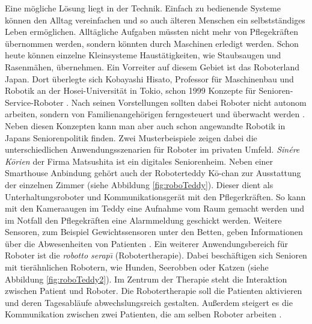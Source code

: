 Eine mögliche Lösung liegt in der Technik. Einfach zu bedienende Systeme können den Alltag vereinfachen und so auch älteren Menschen ein selbstständiges Leben ermöglichen. Alltägliche Aufgaben müssten nicht mehr von Pflegekräften übernommen werden, sondern könnten durch Maschinen erledigt werden. Schon heute können einzelne Kleinsysteme Haustätigkeiten, wie Staubsaugen und Rasenmähen, übernehmen. Ein Vorreiter auf diesem Gebiet ist das Roboterland Japan. Dort überlegte sich Kobayashi Hisato, Professor für Maschinenbau und Robotik an der Hosei-Universität in Tokio, schon 1999 Konzepte für Senioren-Service-Roboter \citep{wagner2009tele}. Nach seinen Vorstellungen sollten dabei Roboter nicht autonom arbeiten, sondern von Familienangehörigen ferngesteuert und überwacht werden \citep{kobayashihisato1999}. Neben diesen Konzepten kann man aber auch schon angewandte Robotik in Japans Seniorenpolitik finden. Zwei Musterbeispiele zeigen dabei die unterschiedlichen Anwendungsszenarien für Roboter im privaten Umfeld. \textit{Sinére K\={o}rien} der Firma Matsushita ist ein digitales Seniorenheim. Neben einer Smarthouse Anbindung gehört auch der Roboterteddy K\={o}-chan zur Ausstattung der einzelnen Zimmer (siehe Abbildung \ref{fig:roboTeddy}). Dieser dient als Unterhaltungsroboter und Kommunikationsgerät mit den Pflegerkräften. So kann mit den Kameraaugen im Teddy eine Aufnahme vom Raum gemacht werden und im Notfall den Pflegekräften eine Alarmmeldung geschickt werden. Weitere Sensoren, zum  Beispiel Gewichtssensoren unter den Betten, geben Informationen über die Abwesenheiten von Patienten \citep{wagner2009tele}. Ein weiterer Anwendungsbereich für Roboter ist die \textit{robotto serap\={\i}} (Robotertherapie). Dabei beschäftigen sich Senioren mit tierähnlichen Robotern, wie Hunden, Seerobben oder Katzen (siehe Abbildung \ref{fig:roboTeddy2}). Im Zentrum der Therapie steht die Interaktion zwischen Patient und Roboter. Die Robotertherapie soll die Patienten aktivieren und deren Tagesabläufe abwechslungsreich gestalten. Außerdem steigert es die Kommunikation zwischen zwei Patienten, die am selben Roboter arbeiten \citep{wagner2009tele}. 

